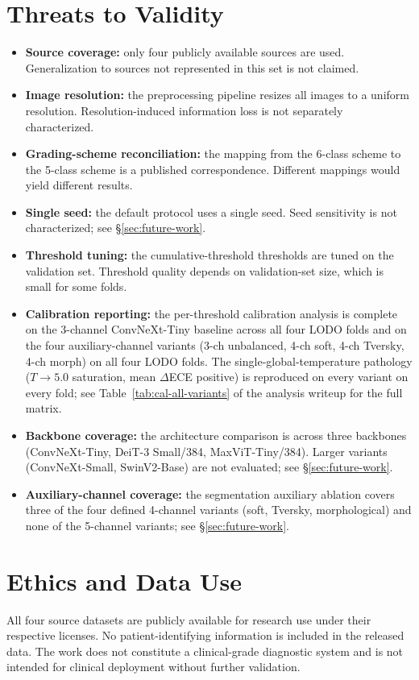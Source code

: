 \documentclass[11pt]{article}
\begin{document}
\section{Threats to Validity}
\begin{itemize}[leftmargin=*, topsep=0pt]
  \item \textbf{Source coverage:} only four publicly available sources are used. Generalization to sources not represented in this set is not claimed.
  \item \textbf{Image resolution:} the preprocessing pipeline resizes all images to a uniform resolution. Resolution-induced information loss is not separately characterized.
  \item \textbf{Grading-scheme reconciliation:} the mapping from the 6-class scheme to the 5-class scheme is a published correspondence. Different mappings would yield different results.
  \item \textbf{Single seed:} the default protocol uses a single seed. Seed sensitivity is not characterized; see \S\ref{sec:future-work}.
  \item \textbf{Threshold tuning:} the cumulative-threshold thresholds are tuned on the validation set. Threshold quality depends on validation-set size, which is small for some folds.
  \item \textbf{Calibration reporting:} the per-threshold calibration analysis is complete on the 3-channel ConvNeXt-Tiny baseline across all four LODO folds and on the four auxiliary-channel variants (3-ch unbalanced, 4-ch soft, 4-ch Tversky, 4-ch morph) on all four LODO folds. The single-global-temperature pathology ($T \to 5.0$ saturation, mean $\Delta$ECE positive) is reproduced on every variant on every fold; see Table~\ref{tab:cal-all-variants} of the analysis writeup for the full matrix.
  \item \textbf{Backbone coverage:} the architecture comparison is across three backbones (ConvNeXt-Tiny, DeiT-3 Small/384, MaxViT-Tiny/384). Larger variants (ConvNeXt-Small, SwinV2-Base) are not evaluated; see \S\ref{sec:future-work}.
  \item \textbf{Auxiliary-channel coverage:} the segmentation auxiliary ablation covers three of the four defined 4-channel variants (soft, Tversky, morphological) and none of the 5-channel variants; see \S\ref{sec:future-work}.
\end{itemize}

\section{Ethics and Data Use}
All four source datasets are publicly available for research use under their respective licenses. No patient-identifying information is included in the released data. The work does not constitute a clinical-grade diagnostic system and is not intended for clinical deployment without further validation.
\end{document}
